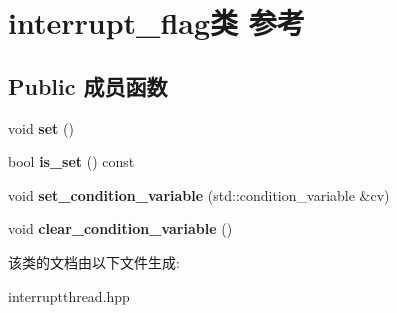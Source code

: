 \hypertarget{classinterrupt__flag}{}\section{interrupt\+\_\+flag类 参考}
\label{classinterrupt__flag}
\subsection*{Public 成员函数}
\begin{DoxyCompactItemize}
\item 
\mbox{\label{classinterrupt__flag_a2a97873c0f9ee0ee81ee4b9f3917b274}} 
void {\bfseries set} ()
\item 
\mbox{\label{classinterrupt__flag_aee5d0cee6b88df285edaf1f418ef366e}} 
bool {\bfseries is\+\_\+set} () const
\item 
\mbox{\label{classinterrupt__flag_aef4001274efffb0ff9bcfe7c0d0f4077}} 
void {\bfseries set\+\_\+condition\+\_\+variable} (std\+::condition\+\_\+variable \&cv)
\item 
\mbox{\label{classinterrupt__flag_a9d9c6d923ff61f653697fa7bd51e2e37}} 
void {\bfseries clear\+\_\+condition\+\_\+variable} ()
\end{DoxyCompactItemize}


该类的文档由以下文件生成\+:\begin{DoxyCompactItemize}
\item 
interruptthread.\+hpp\end{DoxyCompactItemize}

